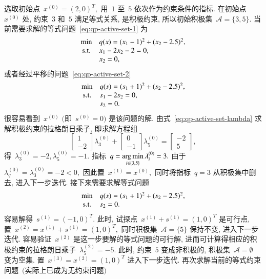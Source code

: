 \begin{exam}
选取初始点~${x}^{(0)} = (2, 0)^T,$ 用~$1$ 至~$5$ 依次作为约束条件的指标. 在初始点~${x}^{(0)}$ 处, 约束~$3$ 和~$5$ 满足等式关系, 是积极约束, 所以初始积极集~$\mathcal{A} = \{ 3, 5 \}.$ 当前需要求解的等式问题~\eqref{eq:qp-active-set-1} 为
\begin{equation*}
\begin{array}{cl}
\min & q({x}) = (x_1 - 1)^2 + (x_2 - 2.5)^2, \\
{\rm s.t.} & x_1 - 2x_2 - 2 = 0, \\
& x_2 = 0,
\end{array}
\end{equation*}
或者经过平移的问题~\eqref{eq:qp-active-set-2}
\begin{equation*}
\begin{array}{cl}
\min & q({s}) = (s_1 + 1)^2 + (s_2 - 2.5)^2, \\
{\rm s.t.} & s_1 - 2s_2 = 0, \\
& s_2 = 0.
\end{array}
\end{equation*}
很容易看到~${x}^{(0)}$ $($即~${s}^{(0)} = {0}$$)$ 是该问题的解. 
由式~\eqref{eq:qp-active-set-lambda} 求解积极约束的拉格朗日乘子, 即求解方程组
\begin{equation*}
\begin{bmatrix} 1 \\ -2 \end{bmatrix} \lambda_3^{(0)} + \begin{bmatrix} 0 \\ -1 \end{bmatrix} \lambda_5^{(0)} = \begin{bmatrix} -2 \\ 5 \end{bmatrix},
\end{equation*}
得~$\lambda_3^{(0)} = -2, \lambda_5^{(0)} = -1.$ 指标~$q = \argmin\limits_{i \in \{ 3, 5 \}} \lambda_i^{(0)} = 3.$ 由于~$\lambda_q^{(0)} = \lambda_3^{(0)} = -2 < 0,$ 因此置~${x}^{(1)} = {x}^{(0)},$ 同时将指标~$q = 3$ 从积极集中删去, 进入下一步迭代. 接下来需要求解等式问题
\begin{equation*}
\begin{array}{cl}
\min & q({s}) = (s_1 + 1)^2 + (s_2 - 2.5)^2, \\
{\rm s.t.} & s_2 = 0.
\end{array}
\end{equation*}
容易解得~${s}^{(1)} = (-1, 0)^T.$ 此时, 试探点~${x}^{(1)} + {s}^{(1)} = (1, 0)^T$ 是可行点,  置~${x}^{(2)} = {x}^{(1)} + {s}^{(1)} = (1, 0)^T,$ 同时积极集~$\mathcal{A} = \{ 5 \}$ 保持不变, 进入下一步迭代. 容易验证~${x}^{(2)}$ 是这一步要解的等式问题的可行解, 进而可计算得相应的积极约束的拉格朗日乘子~$\lambda_5^{(2)} = -5.$ 此时, 约束~$5$ 变成非积极的, 积极集~$\mathcal{A} = \emptyset$ 变为空集. 置~${x}^{(3)} = {x}^{(2)} = (1, 0)^T$ 进入下一步迭代. 再次求解当前的等式约束问题~$($实际上已成为无约束问题$)$
$$
\end{exam}
